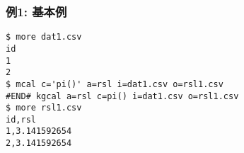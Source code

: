 \subsubsection*{例1: 基本例}



\begin{Verbatim}[baselinestretch=0.7,frame=single]
$ more dat1.csv
id
1
2
$ mcal c='pi()' a=rsl i=dat1.csv o=rsl1.csv
#END# kgcal a=rsl c=pi() i=dat1.csv o=rsl1.csv
$ more rsl1.csv
id,rsl
1,3.141592654
2,3.141592654
\end{Verbatim}
